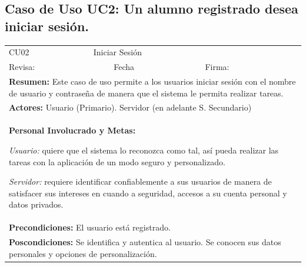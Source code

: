 
\subsection{Caso de Uso UC2: Un alumno registrado desea iniciar sesión.}

\begin{longtable}{|l|p{5.5cm}|l|p{2cm}|l|p{1.9cm}|} \hline
    \cellcolor{grisOscuro} CU02 & \multicolumn{4}{|l|}{  \cellcolor{grisOscuro} Iniciar Sesión} &  \cellcolor{grisClaro}\multirow{2}{1cm}{} \\ \cline{1-5}
    \cellcolor{grisOscuro} Revisa: &  \cellcolor{grisClaro} &  \cellcolor{grisOscuro} Fecha &  \cellcolor{grisClaro} &  \cellcolor{grisOscuro} Firma: & \cellcolor{grisClaro} \\ \hline
    \multicolumn{6}{|p{15cm}|}{ \textbf{Resumen: } Este caso de uso permite a los usuarios iniciar sesión con el nombre de usuario y contraseña de manera que el sistema le permita realizar tareas.

    } \\ \hline

    \multicolumn{6}{|p{15cm}|}{ \textbf{Actores: } Usuario (Primario). Servidor (en adelante S. Secundario)

    } \\ \hline

    \multicolumn{6}{|p{15cm}|}{ \textbf{Personal Involucrado y Metas: }

    \emph{Usuario:} quiere que el sistema lo reconozca como tal, así pueda realizar las tareas con la aplicación de un modo seguro y personalizado.

    \emph{Servidor:} requiere identificar confiablemente a sus usuarios de manera de satisfacer sus intereses en cuando a seguridad, accesos a su cuenta personal y datos privados.

    } \\ \hline

    \multicolumn{6}{|p{15cm}|}{ \textbf{Precondiciones: } El usuario está registrado.

    } \\ \hline

    \multicolumn{6}{|p{15cm}|}{ \textbf{Poscondiciones: } Se identifica y autentica al usuario. Se conocen sus datos personales y opciones de personalización.

}
\end{longtable}
